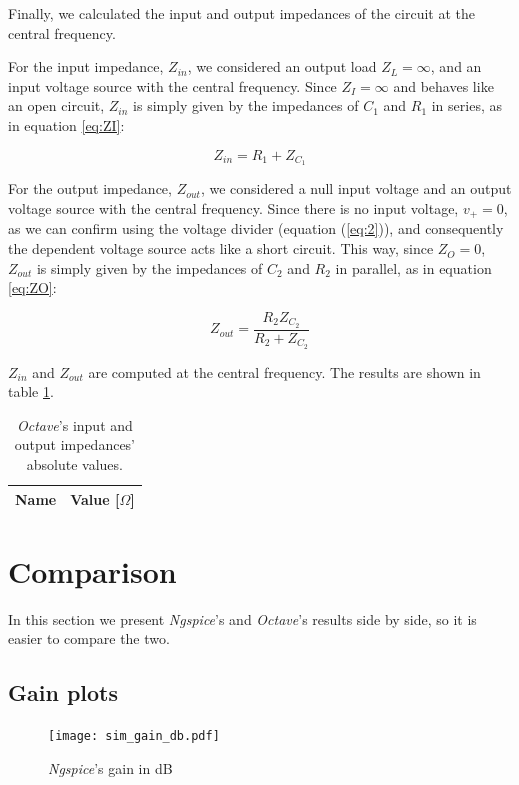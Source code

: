 Finally, we calculated the input and output impedances of the circuit at the central frequency.

For the input impedance, $Z_{in}$, we considered an output load $Z_L=\infty$, and an input voltage source with the central frequency.
 Since $Z_I=\infty$ and behaves like an open circuit, $Z_{in}$ is simply given by the impedances of $C_1$ and $R_1$ in series, as in equation \ref{eq:ZI}:

\begin{equation}
  Z_{in} = R_1 + Z_{C_1}
\label{eq:ZI}
\end{equation}

For the output impedance, $Z_{out}$, we considered a null input voltage and an output voltage source with the central frequency.
Since there is no input voltage, $v_{+}=0$, as we can confirm using the voltage divider (equation (\ref{eq:2})), and consequently the dependent voltage 
source acts like a short circuit. This way, since $Z_O=0$, $Z_{out}$ is simply given by the impedances of $C_2$ and $R_2$ in parallel,
as in equation \ref{eq:ZO}:   

\begin{equation}
  Z_{out} = \frac{R_2 Z_{C_{2}}}{R_2 + Z_{C_{2}}}
\label{eq:ZO}
\end{equation}

$Z_{in}$ and $Z_{out}$ are computed at the central frequency. The results are shown in table \ref{tab:MatZ}.


\begin{table}[h]
    \centering
    \begin{tabular}{|c|c|}
      \hline
      {\bf Name} & {\bf Value [$\Omega$]} \\ \hline
      
    \end{tabular}
    \vspace{-2.5mm}
    \caption{\emph{Octave}'s input and output impedances' absolute values.}\label{tab:MatZ}
\end{table}

\clearpage

\section{Comparison}\label{sec:Comparison}

In this section we present \emph{Ngspice}'s and \emph{Octave}'s results side by side, so it is easier to compare the two.

\subsection{Gain plots}
\begin{figure}[h] \centering
    \texttt{[image: sim\_gain\_db.pdf]}
    \caption{\emph{Ngspice}'s gain in dB}
    \label{fig:SimGain_Comp}
\end{figure}

